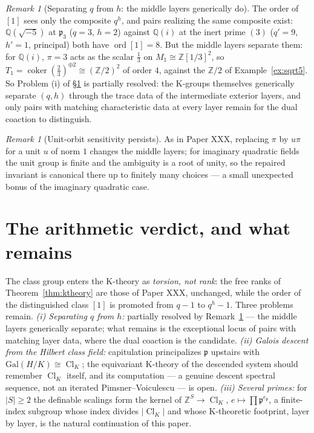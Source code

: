\documentclass[11pt]{amsart}
\theoremstyle{remark}
\newtheorem{remark}[theorem]{Remark}
\newcommand{\pp}{\mathfrak{p}}
\newcommand{\Z}{\mathbb{Z}}
\newcommand{\Q}{\mathbb{Q}}
\newcommand{\Cl}{\operatorname{Cl}}
\newcommand{\ord}{\operatorname{ord}}
\begin{document}
\begin{remark}[Separating $q$ from $h$: the middle layers generically do]\label{rem:separate}
The order of $[1]$ sees only the composite $q^h$, and pairs realizing the same composite
exist: $\Q(\sqrt{-5})$ at $\pp_3$ ($q=3$, $h=2$) against $\Q(i)$ at the inert prime
$(3)$ ($q'=9$, $h'=1$, principal) both have $\ord[1]=8$. But the middle layers separate
them: for $\Q(i)$, $\pi=3$ acts as the scalar $\tfrac13$ on $M_1\cong\Z[1/3]^2$, so
$T_1=\operatorname{coker}(\tfrac23)^{\oplus2}\cong(\Z/2)^2$ of order $4$, against the
$\Z/2$ of Example~\ref{ex:sqrt5}. So Problem (i) of \S\ref{sec:verdict} is partially
resolved: the K-groups themselves generically separate $(q,h)$ through the trace data of
the intermediate exterior layers, and only pairs with matching characteristic data at
every layer remain for the dual coaction to distinguish.
\end{remark}

\begin{remark}[Unit-orbit sensitivity persists]\label{rem:units}
As in Paper XXX, replacing $\pi$ by $u\pi$ for a unit $u$ of norm $1$ changes the middle
layers; for imaginary quadratic fields the unit group is finite and the ambiguity is a
root of unity, so the repaired invariant is canonical there up to finitely many choices
--- a small unexpected bonus of the imaginary quadratic case.
\end{remark}

\section{The arithmetic verdict, and what remains}\label{sec:verdict}

The class group enters the K-theory as \emph{torsion, not rank}: the free ranks of
Theorem~\ref{thm:ktheory} are those of Paper XXX, unchanged, while the order of the
distinguished class $[1]$ is promoted from $q-1$ to $q^{h}-1$. Three problems remain.
\emph{(i) Separating $q$ from $h$:} partially resolved by Remark~\ref{rem:separate} ---
the middle layers generically separate; what remains is the exceptional locus of pairs
with matching layer data, where the dual coaction is the candidate. \emph{(ii) Galois descent from the Hilbert class field:}
capitulation principalizes $\pp$ upstairs with $\mathrm{Gal}(H/K)\cong\Cl_K$; the
equivariant K-theory of the descended system should remember $\Cl_K$ itself, and its
computation --- a genuine descent spectral sequence, not an iterated
Pimsner--Voiculescu --- is open. \emph{(iii) Several primes:} for $|S|\ge2$ the definable
scalings form the kernel of $\Z^S\to\Cl_K$, $e\mapsto\prod\pp^{e_\pp}$, a finite-index
subgroup whose index divides $|\Cl_K|$ and whose K-theoretic footprint, layer by layer, is
the natural continuation of this paper.
\end{document}
